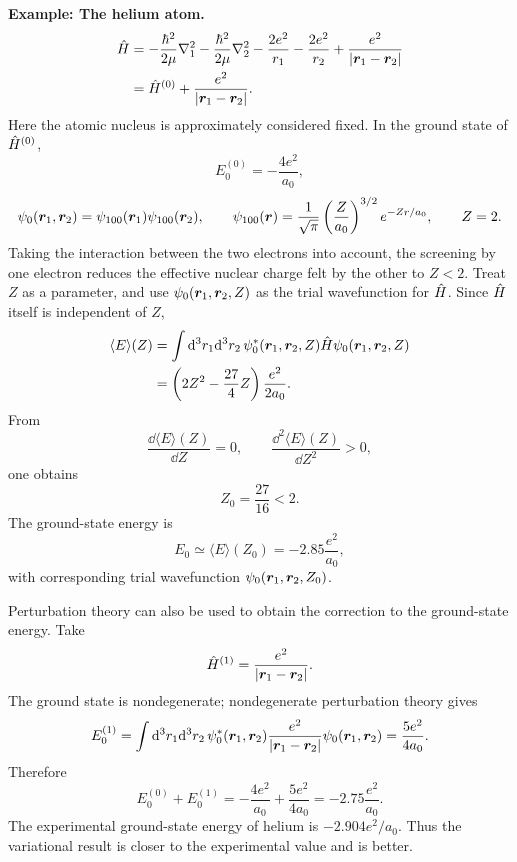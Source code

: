 \textbf{Example: The helium atom.}
\begin{equation}\begin{aligned}
 \hat{H}&=-\frac{\hbar^2}{2\mu}\nabla_1^2
 -\frac{\hbar^2}{2\mu}\nabla_2^2
 -\frac{2e^2}{r_1}-\frac{2e^2}{r_2}
 +\frac{e^2}{|\bm{r}_1-\bm{r}_2|}\\
 &=\hat{H}^{(0)}+\frac{e^2}{|\bm{r}_1-\bm{r}_2|}.
\end{aligned}\end{equation}
Here the atomic nucleus is approximately considered fixed. In the ground state of $\hat{H}^{(0)}$,
\begin{equation}
 E_0^{(0)}=-\frac{4e^2}{a_0},
\end{equation}
\begin{equation}
 \psi_0(\bm{r}_1,\bm{r}_2)=
 \psi_{100}(\bm{r}_1)\psi_{100}(\bm{r}_2),\qquad
 \psi_{100}(\bm{r})=\frac1{\sqrt\pi}
 \left(\frac Z{a_0}\right)^{3/2}e^{-Zr/a_0},\qquad Z=2.
\end{equation}
Taking the interaction between the two electrons into account, the screening by one electron reduces the effective nuclear charge felt by the other to $Z<2$. Treat $Z$ as a parameter, and use $\psi_0(\bm{r}_1,\bm{r}_2,Z)$ as the trial wavefunction for $\hat{H}$. Since $\hat{H}$ itself is independent of $Z$,
\begin{equation}\begin{aligned}
 \langle E\rangle(Z)
 &=\int\mathrm{d}^3r_1\mathrm{d}^3r_2\,
 \psi_0^*(\bm{r}_1,\bm{r}_2,Z)\hat{H}
 \psi_0(\bm{r}_1,\bm{r}_2,Z)\\
 &=\left(2Z^2-\frac{27}{4}Z\right)\frac{e^2}{2a_0}.
\end{aligned}\end{equation}
From
\begin{equation}
 \frac{\dd\langle E\rangle(Z)}{\dd Z}=0,
 \qquad\frac{\dd^2\langle E\rangle(Z)}{\dd Z^2}>0,
\end{equation}
one obtains
\begin{equation}
 Z_0=\frac{27}{16}<2.
\end{equation}
The ground-state energy is
\begin{equation}
 E_0\simeq\langle E\rangle(Z_0)
 =-2.85\frac{e^2}{a_0},
\end{equation}
with corresponding trial wavefunction $\psi_0(\bm{r}_1,\bm{r}_2,Z_0)$.

Perturbation theory can also be used to obtain the correction to the ground-state energy. Take
\begin{equation}
 \hat{H}^{(1)}=\frac{e^2}{|\bm{r}_1-\bm{r}_2|}.
\end{equation}
The ground state is nondegenerate; nondegenerate perturbation theory gives
\begin{equation}
 E_0^{(1)}=\int\mathrm{d}^3r_1\mathrm{d}^3r_2\,
 \psi_0^*(\bm{r}_1,\bm{r}_2)
 \frac{e^2}{|\bm{r}_1-\bm{r}_2|}
 \psi_0(\bm{r}_1,\bm{r}_2)
 =\frac{5e^2}{4a_0}.
\end{equation}
Therefore
\begin{equation}
 E_0^{(0)}+E_0^{(1)}
 =-\frac{4e^2}{a_0}+\frac{5e^2}{4a_0}
 =-2.75\frac{e^2}{a_0}.
\end{equation}
The experimental ground-state energy of helium is $-2.904e^2/a_0$. Thus the variational result is closer to the experimental value and is better.
